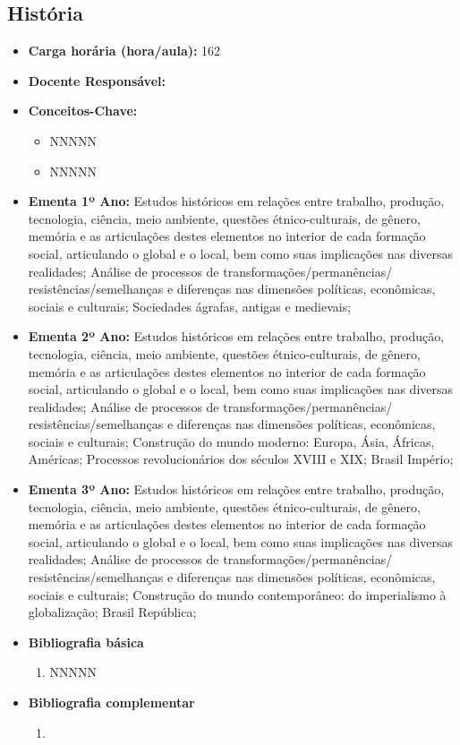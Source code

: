 \documentclass[11pt,fleqn]{book} %
\begin{document}
\subsection{História}\label{disc:historia}
\begin{itemize}
	\item \textbf{Carga horária (hora/aula):} 162
	\item \textbf{Docente Responsável:}
	\item \textbf{Conceitos-Chave:}
	\begin{itemize}
		\item NNNNN
		\item NNNNN
	\end{itemize}
	\item \textbf{Ementa 1º Ano:} 
	Estudos históricos em relações entre trabalho, produção, tecnologia, ciência, meio ambiente, questões étnico-culturais, de gênero, memória e as articulações destes elementos no interior de cada formação social, articulando o global e o local, bem como suas implicações nas diversas realidades; 
	Análise de processos de transformações/permanências/ resistências/semelhanças e diferenças nas dimensões políticas, econômicas, sociais e culturais;
	Sociedades ágrafas, antigas e medievais;
	\item \textbf{Ementa 2º Ano:} 
	Estudos históricos em relações entre trabalho, produção, tecnologia, ciência, meio ambiente, questões étnico-culturais, de gênero, memória e as articulações destes elementos no interior de cada formação social, articulando o global e o local, bem como suas implicações nas diversas realidades; 
    Análise de processos de transformações/permanências/ resistências/semelhanças e diferenças nas dimensões políticas, econômicas, sociais e culturais;		
	Construção do mundo moderno: Europa, Ásia, Áfricas, Américas;
	Processos revolucionários dos séculos XVIII e XIX; 
	Brasil Império;
	\item \textbf{Ementa 3º Ano:} 
	Estudos históricos em relações entre trabalho, produção, tecnologia, ciência, meio ambiente, questões étnico-culturais, de gênero, memória e as articulações destes elementos no interior de cada formação social, articulando o global e o local, bem como suas implicações nas diversas realidades; 
	Análise de processos de transformações/permanências/ resistências/semelhanças e diferenças nas dimensões políticas, econômicas, sociais e culturais;			
	Construção do mundo contemporâneo: do imperialismo à globalização; 
	Brasil República;
	\item \textbf{Bibliografia básica}
	\begin{enumerate}
		\item NNNNN
	\end{enumerate}
	\item \textbf{Bibliografia complementar}
	\begin{enumerate}
		\item 
	\end{enumerate}	
\end{itemize}
\end{document}
